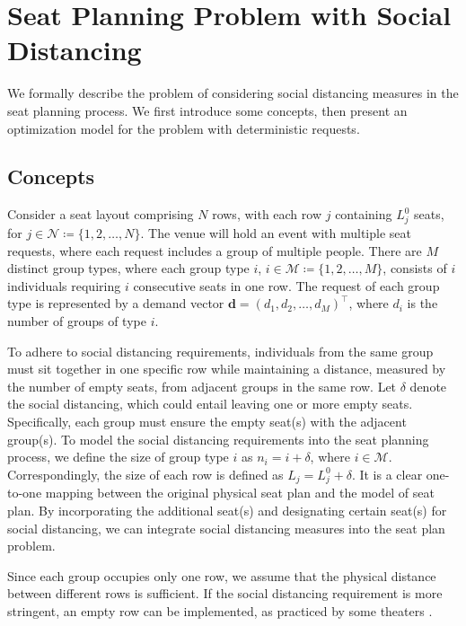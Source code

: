 \section{Seat Planning Problem with Social Distancing}\label{problem_description}
We formally describe the problem of considering social distancing measures in the seat planning process. We first introduce some concepts, then present an optimization model for the problem with deterministic requests.

\subsection{Concepts}
Consider a seat layout comprising $N$ rows, with each row $j$ containing $L_j^0$ seats, for  $j \in \mathcal{N} \coloneqq \{1,2, \ldots, N\}$. The venue will hold an event with multiple seat requests, where each request includes a group of multiple people.
There are $M$ distinct group types, where each group type $i$, $i \in \mathcal{M} \coloneqq \{1, 2, \ldots, M\}$, consists of $i$ individuals requiring $i$ consecutive seats in one row. The request of each group type is represented by a demand vector $\mathbf{d} = (d_1, d_2, \ldots, d_M)^{\intercal}$, where $d_i$ is the number of groups of type $i$.

To adhere to social distancing requirements, individuals from the same group must sit together in one specific row while maintaining a distance, measured by the number of empty seats, from adjacent groups in the same row.
Let $\delta$ denote the social distancing, which could entail leaving one or more empty seats. Specifically, each group must ensure the empty seat(s) with the adjacent group(s). To model the social distancing requirements into the seat planning process, we define the size of group type $i$ as $n_i = i + \delta$, where $i \in \mathcal{M}$. Correspondingly, the size of each row is defined as $L_j = L_j^{0} + \delta$. It is a clear one-to-one mapping between the original physical seat plan and the model of seat plan. By incorporating the additional seat(s) and designating certain seat(s) for social distancing, we can integrate social distancing measures into the seat plan problem.

Since each group occupies only one row, we assume that the physical distance between different rows is sufficient. If the social distancing requirement is more stringent, an empty row can be implemented, as practiced by some theaters \cite{Berlin_theater}.

